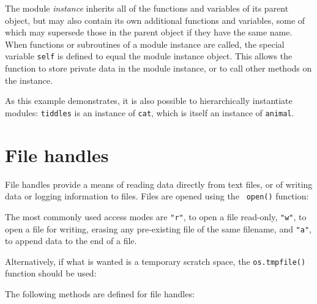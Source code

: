 The module {\it instance} inherits all of the functions and variables of its
parent object, but may also contain its own additional functions and variables,
some of which may supersede those in the parent object if they have the same
name. When functions or subroutines of a module instance are called, the
special variable {\tt self} is defined to equal the module instance object.
This allows the function to store private data in the module instance, or to
call other methods on the instance.

\vspace{3mm}

\vspace{3mm}

As this example demonstrates, it is also possible to hierarchically instantiate
modules: {\tt tiddles} is an instance of {\tt cat}, which is itself an instance
of {\tt animal}.

\section{File handles}

File handles provide a means of reading data directly from text files, or of
writing data or logging information to files. Files are opened using the {\tt
open()} function:

\vspace{2mm}
\vspace{4mm}

\noindent The most commonly used access modes are {\tt "r"}, to open a file read-only, {\tt "w"}, to open a file for writing, erasing any pre-existing file of the same filename, and {\tt "a"}, to append data to the end of a file.

Alternatively, if what is wanted is a temporary scratch space, the {\tt os.tmpfile()} function should be used:

\vspace{2mm}
\vspace{4mm}

The following methods are defined for file handles:


